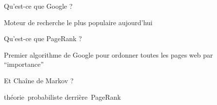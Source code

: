 


\begin{frame}{\Large Qu'est-ce que{ \color{customRed}Google} ?}

\pause
\begin{center}
\Huge Moteur de recherche
\vskip 0.1cm
\Huge le plus populaire
\vskip 0.1cm
\Huge aujourd'hui
\end{center}

\normalsize
\end{frame}


\begin{frame}{\Large Qu'est-ce que {\color{customRed}PageRank} ?}

\begin{center}
\pause \Huge Premier algorithme de Google
\vskip 0.1cm
\pause \Huge pour ordonner
\vskip 0.1cm
\pause \Huge toutes les pages web
\vskip 0.1cm
\pause \Huge par ``importance''
\end{center}

\normalsize
\end{frame}


\begin{frame}{\Large Et {\color{customRed}Cha\^{i}ne de Markov} ?}

\begin{center}
\pause \Huge th\'{e}orie \,probabiliste
\vskip 0.3cm
\pause \Huge derri\`{e}re \,PageRank
\end{center}

\normalsize
\end{frame}

